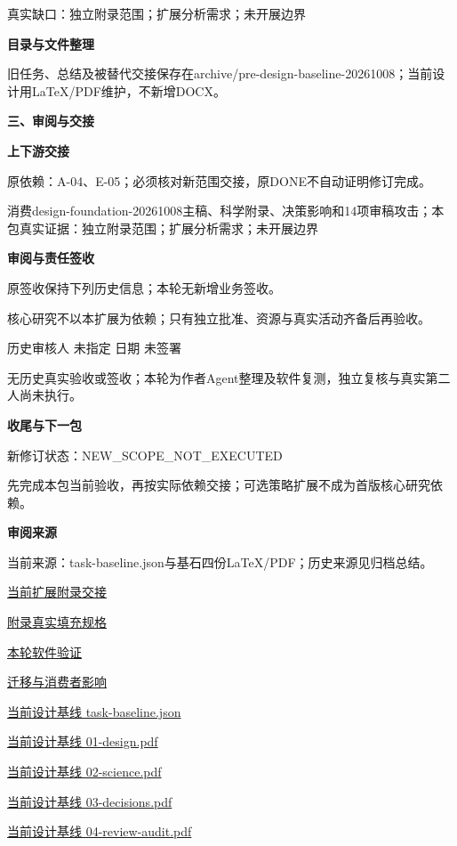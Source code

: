 \documentclass[11pt,a4paper]{article}
\newcommand{\reviewsection}[1]{\par\Needspace{5\baselineskip}\vspace{10pt}\begin{center}{\titlelatin\titlecjk\bfseries\fontsize{14}{20}\selectfont #1}\end{center}}
\newcommand{\reviewsubsection}[1]{\par\Needspace{4\baselineskip}\vspace{4pt}\begin{center}{\titlelatin\titlecjk\bfseries\fontsize{12}{18}\selectfont #1}\end{center}}
\begin{document}
真实缺口：独立附录范围；扩展分析需求；未开展边界


\reviewsubsection{2.4 目录与文件整理}
旧任务、总结及被替代交接保存在archive/\allowbreak{}pre-\allowbreak{}design-\allowbreak{}baseline-\allowbreak{}20261008；当前设计用LaTeX/\allowbreak{}PDF维护，不新增DOCX。


\reviewsection{三、审阅与交接}
\reviewsubsection{3.1 上下游交接}
原依赖：A-\allowbreak{}04、E-\allowbreak{}05；必须核对新范围交接，原DONE不自动证明修订完成。


消费design-\allowbreak{}foundation-\allowbreak{}20261008主稿、科学附录、决策影响和14项审稿攻击；本包真实证据：独立附录范围；扩展分析需求；未开展边界


\reviewsubsection{3.2 审阅与责任签收}
原签收保持下列历史信息；本轮无新增业务签收。


核心研究不以本扩展为依赖；只有独立批准、资源与真实活动齐备后再验收。


历史审核人 未指定    日期 未签署


无历史真实验收或签收；本轮为作者Agent整理及软件复测，独立复核与真实第二人尚未执行。


\reviewsubsection{3.3 收尾与下一包}
新修订状态：NEW\_\allowbreak{}SCOPE\_\allowbreak{}NOT\_\allowbreak{}EXECUTED


先完成本包当前验收，再按实际依赖交接；可选策略扩展不成为首版核心研究依赖。


\reviewsubsection{3.4 审阅来源}
当前来源：task-\allowbreak{}baseline.json与基石四份LaTeX/\allowbreak{}PDF；历史来源见归档总结。


\href{file:///D:/Agent/srp/agent/tasks/U12-08/outputs/current-extension.md}{当前扩展附录交接}


\href{file:///D:/Agent/srp/agent/tasks/U12-08/outputs/appendix-spec.md}{附录真实填充规格}


\href{file:///D:/Agent/srp/agent/tasks/U12-08/evidence/verification.json}{本轮软件验证}


\href{file:///D:/Agent/srp/agent/tasks/U12-08/evidence/consumer-impact.md}{迁移与消费者影响}


\href{file:///D:/Agent/srp/agent/design/design-foundation-20261008/task-baseline.json}{当前设计基线 task-\allowbreak{}baseline.json}


\href{file:///D:/Agent/srp/agent/design/design-foundation-20261008/01-design.pdf}{当前设计基线 01-\allowbreak{}design.pdf}


\href{file:///D:/Agent/srp/agent/design/design-foundation-20261008/02-science.pdf}{当前设计基线 02-\allowbreak{}science.pdf}


\href{file:///D:/Agent/srp/agent/design/design-foundation-20261008/03-decisions.pdf}{当前设计基线 03-\allowbreak{}decisions.pdf}


\href{file:///D:/Agent/srp/agent/design/design-foundation-20261008/04-review-audit.pdf}{当前设计基线 04-\allowbreak{}review-\allowbreak{}audit.pdf}
\end{document}
